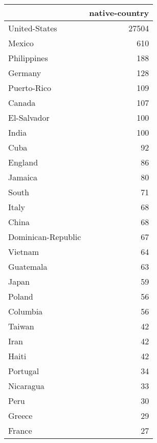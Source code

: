 \begin{tabular}{lr}
\toprule
{} &  native-country \\
\midrule
 United-States              &           27504 \\
 Mexico                     &             610 \\
 Philippines                &             188 \\
 Germany                    &             128 \\
 Puerto-Rico                &             109 \\
 Canada                     &             107 \\
 El-Salvador                &             100 \\
 India                      &             100 \\
 Cuba                       &              92 \\
 England                    &              86 \\
 Jamaica                    &              80 \\
 South                      &              71 \\
 Italy                      &              68 \\
 China                      &              68 \\
 Dominican-Republic         &              67 \\
 Vietnam                    &              64 \\
 Guatemala                  &              63 \\
 Japan                      &              59 \\
 Poland                     &              56 \\
 Columbia                   &              56 \\
 Taiwan                     &              42 \\
 Iran                       &              42 \\
 Haiti                      &              42 \\
 Portugal                   &              34 \\
 Nicaragua                  &              33 \\
 Peru                       &              30 \\
 Greece                     &              29 \\
 France                     &              27 \\

\end{tabular}
